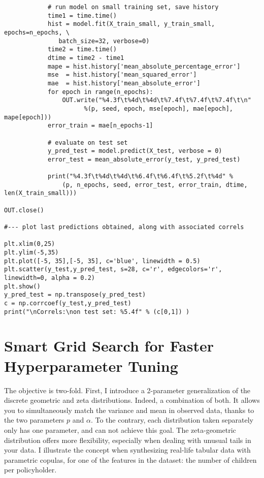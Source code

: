 \documentclass[oneside,10pt]{book}
\begin{document}
\begin{lstlisting}
            # run model on small training set, save history
            time1 = time.time()
            hist = model.fit(X_train_small, y_train_small, epochs=n_epochs, \
               batch_size=32, verbose=0)
            time2 = time.time()
            dtime = time2 - time1
            mape = hist.history['mean_absolute_percentage_error']
            mse  = hist.history['mean_squared_error']
            mae  = hist.history['mean_absolute_error']
            for epoch in range(n_epochs):
                OUT.write("%4.3f\t%4d\t%4d\t%7.4f\t%7.4f\t%7.4f\t\n"
                      %(p, seed, epoch, mse[epoch], mae[epoch], mape[epoch]))
            error_train = mae[n_epochs-1]

            # evaluate on test set
            y_pred_test = model.predict(X_test, verbose = 0)
            error_test = mean_absolute_error(y_test, y_pred_test)

            print("%4.3f\t%4d\t%4d\t%6.4f\t%6.4f\t%5.2f\t%4d" %
                (p, n_epochs, seed, error_test, error_train, dtime, len(X_train_small)))

OUT.close()

#--- plot last predictions obtained, along with associated correls

plt.xlim(0,25)
plt.ylim(-5,35)
plt.plot([-5, 35],[-5, 35], c='blue', linewidth = 0.5)
plt.scatter(y_test,y_pred_test, s=28, c='r', edgecolors='r', linewidth=0, alpha = 0.2)
plt.show()
y_pred_test = np.transpose(y_pred_test)
c = np.corrcoef(y_test,y_pred_test)
print("\nCorrels:\non test set: %5.4f" % (c[0,1]) )
\end{lstlisting}






\section{Smart Grid Search for Faster Hyperparameter Tuning}\label{smargsxxbv}


The objective is two-fold. First, I introduce a 2-parameter generalization of the discrete geometric and zeta distributions.
Indeed, a combination of both. It allows you to simultaneously match the variance and mean in observed data, thanks to the two
 parameters $p$ and $\alpha$. To the contrary, each distribution taken separately only has one parameter, and can not achieve this goal. The zeta-geometric distribution offers more flexibility, especially when dealing with
 unusual tails in your data. I illustrate the concept when synthesizing real-life tabular data with parametric copulas, for one of the features
 in the dataset: the number of children per policyholder.
\end{document}
